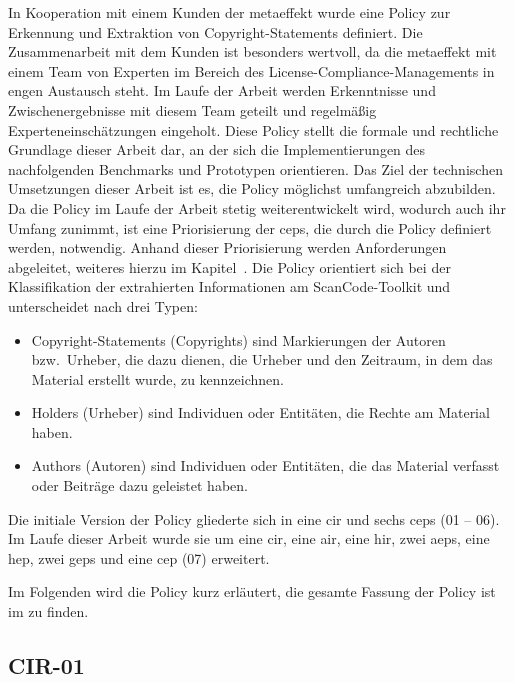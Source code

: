 In Kooperation mit einem Kunden der metaeffekt wurde eine Policy zur Erkennung und Extraktion von Copyright-Statements definiert.
Die Zusammenarbeit mit dem Kunden ist besonders wertvoll, da die metaeffekt mit einem Team von Experten im Bereich des License-Compliance-Managements in engen Austausch steht.
Im Laufe der Arbeit werden Erkenntnisse und Zwischenergebnisse mit diesem Team geteilt und regelmäßig Experteneinschätzungen eingeholt.
Diese Policy stellt die formale und rechtliche Grundlage dieser Arbeit dar, an der sich die Implementierungen des nachfolgenden Benchmarks und Prototypen orientieren.
Das Ziel der technischen Umsetzungen dieser Arbeit ist es, die Policy möglichst umfangreich abzubilden.
Da die Policy im Laufe der Arbeit stetig weiterentwickelt wird, wodurch auch ihr Umfang zunimmt, ist eine Priorisierung der \glspl{cep}, die durch die Policy definiert werden, notwendig.
Anhand dieser Priorisierung werden Anforderungen abgeleitet, weiteres hierzu im Kapitel~.
Die Policy orientiert sich bei der Klassifikation der extrahierten Informationen am ScanCode-Toolkit und unterscheidet nach drei Typen:
\begin{itemize}
    \item Copyright-Statements (Copyrights) sind Markierungen der Autoren bzw.\ Urheber, die dazu dienen, die Urheber und den Zeitraum, in dem das Material erstellt wurde, zu kennzeichnen.
    \item Holders (Urheber) sind Individuen oder Entitäten, die Rechte am Material haben.
    \item Authors (Autoren) sind Individuen oder Entitäten, die das Material verfasst oder Beiträge dazu geleistet haben.
\end{itemize}

Die initiale Version der Policy gliederte sich in eine \gls{cir} und sechs \glspl{cep} (01 -- 06).
Im Laufe dieser Arbeit wurde sie um eine \gls{cir}, eine \gls{air}, eine \gls{hir}, zwei \glspl{aep}, eine \gls{hep}, zwei \glspl{gep} und eine \gls{cep} (07) erweitert.

Im Folgenden wird die Policy kurz erläutert, die gesamte Fassung der Policy ist im  zu finden.


\subsection{CIR-01}\label{subsec:cir-01}

